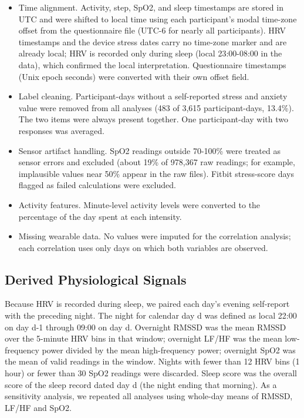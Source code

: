 \documentclass[11pt, a4paper, oneside]{article}
\begin{document}
\begin{itemize}
\item Time alignment. Activity, step, SpO2, and sleep timestamps are stored in UTC and were shifted to local time using each participant's modal time-zone offset from the questionnaire file (UTC-6 for nearly all participants). HRV timestamps and the device stress dates carry no time-zone marker and are already local; HRV is recorded only during sleep (local 23:00-08:00 in the data), which confirmed the local interpretation. Questionnaire timestamps (Unix epoch seconds) were converted with their own offset field.

\item Label cleaning. Participant-days without a self-reported stress and anxiety value were removed from all analyses (483 of 3,615 participant-days, 13.4\%). The two items were always present together. One participant-day with two responses was averaged.

\item Sensor artifact handling. SpO2 readings outside 70-100\% were treated as sensor errors and excluded (about 19\% of 978,367 raw readings; for example, implausible values near 50\% appear in the raw files). Fitbit stress-score days flagged as failed calculations were excluded.

\item Activity features. Minute-level activity levels were converted to the percentage of the day spent at each intensity.

\item Missing wearable data. No values were imputed for the correlation analysis; each correlation uses only days on which both variables are observed.
\end{itemize}

\subsection{Derived Physiological Signals}
Because HRV is recorded during sleep, we paired each day's evening self-report with the preceding night. The night for calendar day d was defined as local 22:00 on day d-1 through 09:00 on day d. Overnight RMSSD was the mean RMSSD over the 5-minute HRV bins in that window; overnight LF/HF was the mean low-frequency power divided by the mean high-frequency power; overnight SpO2 was the mean of valid readings in the window. Nights with fewer than 12 HRV bins (1 hour) or fewer than 30 SpO2 readings were discarded. Sleep score was the overall score of the sleep record dated day d (the night ending that morning). As a sensitivity analysis, we repeated all analyses using whole-day means of RMSSD, LF/HF and SpO2.
\end{document}
